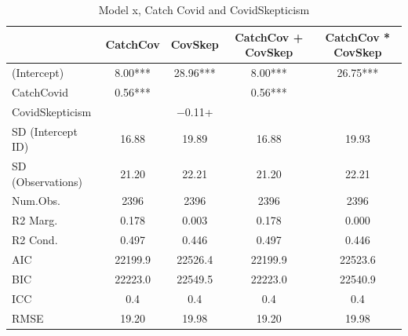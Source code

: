 \documentclass[]{report}
\begin{document}
\begin{table}
	
	\caption{Model x, Catch Covid and CovidSkepticism}
	\centering
	\begin{tabular}[t]{lcccc}
		\toprule
		& CatchCov & CovSkep & CatchCov + CovSkep & CatchCov * CovSkep\\
		\midrule
		(Intercept) & \num{8.00}*** & \num{28.96}*** & \num{8.00}*** & \num{26.75}***\\
		CatchCovid & \num{0.56}*** &  & \num{0.56}*** & \\
		CovidSkepticism &  & \num{-0.11}+ &  & \\
		SD (Intercept ID) & \num{16.88} & \num{19.89} & \num{16.88} & \num{19.93}\\
		SD (Observations) & \num{21.20} & \num{22.21} & \num{21.20} & \num{22.21}\\
		\midrule
		Num.Obs. & \num{2396} & \num{2396} & \num{2396} & \num{2396}\\
		R2 Marg. & \num{0.178} & \num{0.003} & \num{0.178} & \num{0.000}\\
		R2 Cond. & \num{0.497} & \num{0.446} & \num{0.497} & \num{0.446}\\
		AIC & \num{22199.9} & \num{22526.4} & \num{22199.9} & \num{22523.6}\\
		BIC & \num{22223.0} & \num{22549.5} & \num{22223.0} & \num{22540.9}\\
		ICC & \num{0.4} & \num{0.4} & \num{0.4} & \num{0.4}\\
		RMSE & \num{19.20} & \num{19.98} & \num{19.20} & \num{19.98}\\
		\bottomrule
	\end{tabular}
\end{table}
\end{document}
